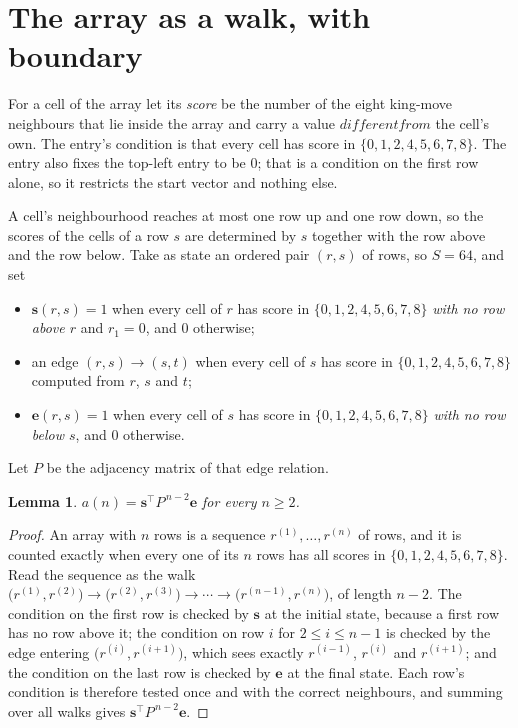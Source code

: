 \documentclass[11pt,a4paper]{article}
\theoremstyle{plain}
\newtheorem{lemma}[theorem]{Lemma}
\theoremstyle{definition}
\begin{document}
\section{The array as a walk, with boundary}

For a cell of the array let its \emph{score} be the number of the eight king-move neighbours that lie inside
the array and carry a value $different from$ the cell's own. The entry's condition is that every cell
has score in $\{0,1,2,4,5,6,7,8\}$. The entry also fixes the top-left entry to be $0$; that is a condition on the first row alone, so it restricts the start vector and nothing else.

A cell's neighbourhood reaches at most one row up and one row down, so the scores of the
cells of a row $s$ are determined by $s$ together with the row above and the row below.
Take as state an ordered pair $(r,s)$ of rows, so $S=64$, and set
\begin{itemize}
\item $\mathbf{s}(r,s)=1$ when every cell of $r$ has score in $\{0,1,2,4,5,6,7,8\}$ \emph{with no row
above $r$} and $r_1=0$, and $0$ otherwise;
\item an edge $(r,s)\to(s,t)$ when every cell of $s$ has score in $\{0,1,2,4,5,6,7,8\}$ computed from
$r$, $s$ and $t$;
\item $\mathbf{e}(r,s)=1$ when every cell of $s$ has score in $\{0,1,2,4,5,6,7,8\}$ \emph{with no row
below $s$}, and $0$ otherwise.
\end{itemize}
Let $P$ be the adjacency matrix of that edge relation.

\begin{lemma}\label{lem:walk}
$a(n)=\mathbf{s}^{\!\top}P^{\,n-2}\mathbf{e}$ for every $n\ge2$.
\end{lemma}

\begin{proof}
An array with $n$ rows is a sequence $r^{(1)},\dots,r^{(n)}$ of rows, and it is counted
exactly when every one of its $n$ rows has all scores in $\{0,1,2,4,5,6,7,8\}$. Read the sequence as the
walk $\bigl(r^{(1)},r^{(2)}\bigr)\to\bigl(r^{(2)},r^{(3)}\bigr)\to\cdots\to
\bigl(r^{(n-1)},r^{(n)}\bigr)$, of length $n-2$. The condition on the first row is
checked by $\mathbf{s}$ at the initial state, because a first row has no row above it; the
condition on row $i$ for $2\le i\le n-1$ is checked by the edge entering
$\bigl(r^{(i)},r^{(i+1)}\bigr)$, which sees exactly $r^{(i-1)}$, $r^{(i)}$ and
$r^{(i+1)}$; and the condition on the last row is checked by $\mathbf{e}$ at the final
state. Each row's condition is therefore tested once and with the correct neighbours, and
summing over all walks gives $\mathbf{s}^{\!\top}P^{\,n-2}\mathbf{e}$.
\end{proof}
\end{document}
